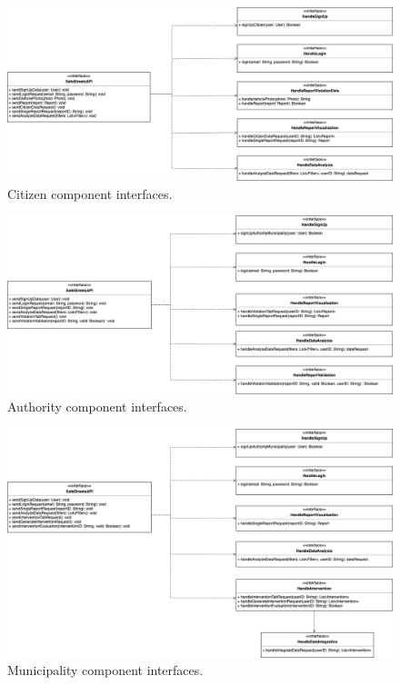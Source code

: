 \begin{figure}[H]
	\centering
	\includegraphics[width=\linewidth]{Images/CitizenComponentInterfaces}
	\caption{Citizen component interfaces.}
\end{figure}
\begin{figure}[H]
	\centering
	\includegraphics[width=\linewidth]{Images/AuthorityComponentInterfaces}
	\caption{Authority component interfaces.}
\end{figure}
\begin{figure}[H]
	\centering
	\includegraphics[width=\linewidth]{Images/MunicipalityComponentInterfaces}
	\caption{Municipality component interfaces.}
\end{figure}

